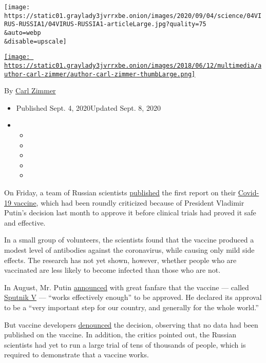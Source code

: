 \texttt{[image: https://static01.graylady3jvrrxbe.onion/images/2020/09/04/science/04VIRUS-RUSSIA1/04VIRUS-RUSSIA1-articleLarge.jpg?quality=75\\\&auto=webp\\\&disable=upscale]}

\href{https://www.nytimes3xbfgragh.onion/by/carl-zimmer}{\texttt{[image: https://static01.graylady3jvrrxbe.onion/images/2018/06/12/multimedia/author-carl-zimmer/author-carl-zimmer-thumbLarge.png]}}

By \href{https://www.nytimes3xbfgragh.onion/by/carl-zimmer}{Carl Zimmer}

\begin{itemize}
\item
  Published Sept. 4, 2020Updated Sept. 8, 2020
\item
  \begin{itemize}
  \item
  \item
  \item
  \item
  \item
  \end{itemize}
\end{itemize}

On Friday, a team of Russian scientists
\href{https://www.thelancet.com/journals/lancet/article/PIIS0140-6736(20)31866-3/fulltext}{published}
the first report on their
\href{https://www.nytimes3xbfgragh.onion/2020/09/10/health/covid-astrazeneca-vaccine-trans.html}{Covid-19
vaccine}, which had been roundly criticized because of President
Vladimir Putin's decision last month to approve it before clinical
trials had proved it safe and effective.

In a small group of volunteers, the scientists found that the vaccine
produced a modest level of antibodies against the coronavirus, while
causing only mild side effects. The research has not yet shown, however,
whether people who are vaccinated are less likely to become infected
than those who are not.

In August, Mr. Putin
\href{https://www.nytimes3xbfgragh.onion/2020/08/11/world/europe/russia-coronavirus-vaccine-approval.html}{announced}
with great fanfare that the vaccine --- called
\href{https://sputnikvaccine.com/}{Sputnik V} --- ``works effectively
enough'' to be approved. He declared its approval to be a ``very
important step for our country, and generally for the whole world.''

But vaccine developers
\href{https://www.nytimes3xbfgragh.onion/2020/08/11/health/russia-covid-19-vaccine-safety.html}{denounced}
the decision, observing that no data had been published on the vaccine.
In addition, the critics pointed out, the Russian scientists had yet to
run a large trial of tens of thousands of people, which is required to
demonstrate that a vaccine works.

